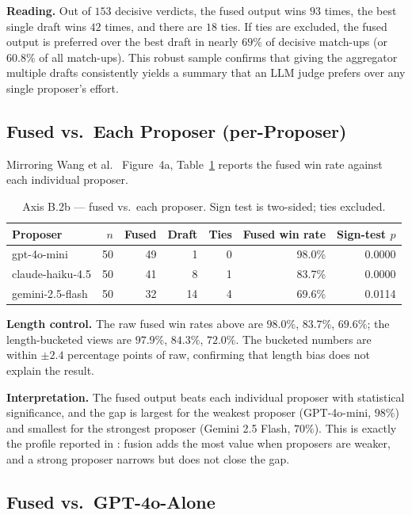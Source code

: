 \textbf{Reading.} Out of $153$ decisive verdicts, the fused output wins $93$ times, the best single draft wins $42$ times, and there are $18$ ties. If ties are excluded, the fused output is preferred over the best draft in nearly $69\%$ of decisive match-ups (or $60.8\%$ of all match-ups). This robust sample confirms that giving the aggregator multiple drafts consistently yields a summary that an LLM judge prefers over any single proposer's effort.

\subsection{Fused vs.\ Each Proposer (per-Proposer)}

Mirroring Wang et al.\ \cite{Wang2024} Figure~4a, Table~\ref{tab:axisB2b}
reports the fused win rate against each individual proposer.

\begin{table}[H]
  \centering
  \caption{Axis B.2b --- fused vs.\ each proposer.
  Sign test is two-sided; ties excluded.}
  \label{tab:axisB2b}
  \begin{tabular}{lrrrrrr}
    \toprule
    Proposer & $n$ & Fused & Draft & Ties & Fused win rate & Sign-test $p$ \\
    \midrule
    gpt-4o-mini       & 50 & 49 & 1 & 0 & 98.0\% & 0.0000 \\
    claude-haiku-4.5  & 50 & 41 & 8 & 1 & 83.7\% & 0.0000 \\
    gemini-2.5-flash  & 50 & 32 & 14 & 4 & 69.6\% & 0.0114 \\
    \bottomrule
  \end{tabular}
\end{table}

\textbf{Length control.} The raw fused win rates above are
$98.0\%$, $83.7\%$, $69.6\%$; the length-bucketed views are $97.9\%$,
$84.3\%$, $72.0\%$. The bucketed numbers are within $\pm 2.4$
percentage points of raw, confirming that length bias does not
explain the result.

\textbf{Interpretation.} The fused output beats each individual
proposer with statistical significance, and the gap is largest for
the weakest proposer (GPT-4o-mini, $98\%$) and smallest for the
strongest proposer (Gemini 2.5 Flash, $70\%$). This is exactly the
profile reported in \cite{Wang2024}: fusion adds the most value when
proposers are weaker, and a strong proposer narrows but does not
close the gap.

\subsection{Fused vs.\ GPT-4o-Alone}

